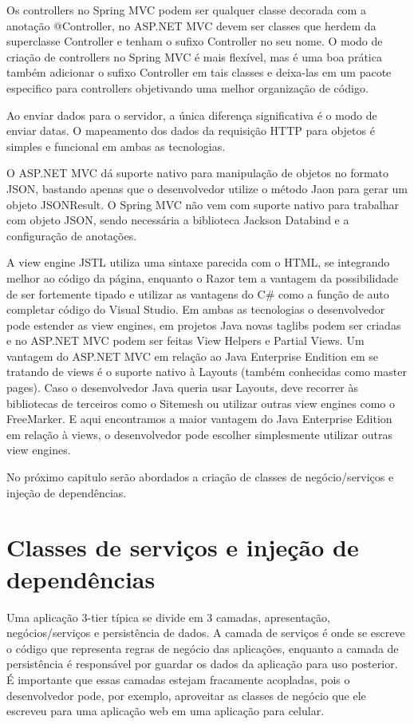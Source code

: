\documentclass[a4paper,12pt]{article}
\begin{document}
Os controllers no Spring MVC podem ser qualquer classe decorada com a anotação @Controller, no ASP.NET MVC devem ser classes que herdem da superclasse Controller e tenham o sufixo Controller no seu nome. O modo de criação de controllers no Spring MVC é mais flexível, mas é uma boa prática também adicionar o sufixo Controller em tais classes e deixa-las em um pacote especifico para controllers objetivando uma melhor organização de código.

Ao enviar dados para o servidor, a única diferença significativa é o modo de enviar datas. O mapeamento dos dados da requisição HTTP para objetos é simples e funcional em ambas as tecnologias.

O ASP.NET MVC dá suporte nativo para manipulação de objetos no formato JSON, bastando apenas que o desenvolvedor utilize o método Jaon para gerar um objeto JSONResult. O Spring MVC não vem com suporte nativo para trabalhar com objeto JSON, sendo necessária a biblioteca Jackson Databind e a configuração de anotações.

A view engine JSTL utiliza uma sintaxe parecida com o HTML, se integrando melhor ao código da página, enquanto o Razor tem a vantagem da possibilidade de ser fortemente tipado e utilizar as vantagens do C\# como a função de auto completar código do Visual Studio. Em ambas as tecnologias o desenvolvedor pode estender as view engines, em projetos Java novas taglibs podem ser criadas e no ASP.NET MVC podem ser feitas View Helpers e Partial Views. Um vantagem do ASP.NET MVC em relação ao Java Enterprise Endition em se tratando de views é o suporte nativo à Layouts (também conhecidas como master pages). Caso o desenvolvedor Java queria usar Layouts, deve recorrer às bibliotecas de terceiros como o Sitemesh ou utilizar outras view engines como o FreeMarker. E aqui encontramos a maior vantagem do Java Enterprise Edition em relação à views, o desenvolvedor pode escolher simplesmente utilizar outras view engines.

No próximo capitulo serão abordados a criação de classes de negócio/serviços e injeção de dependências. 

\newpage
\section{Classes de serviços e injeção de dependências}

Uma aplicação 3-tier típica se divide em 3 camadas, apresentação, negócios/serviços e persistência de dados. A camada de serviços é onde se escreve o código que representa regras de negócio das aplicações, enquanto a camada de persistência é responsável por guardar os dados da aplicação para uso posterior. É importante que essas camadas estejam fracamente acopladas, pois o desenvolvedor pode, por exemplo, aproveitar as classes de negócio que ele escreveu para uma aplicação web em uma aplicação para celular.
\end{document}
